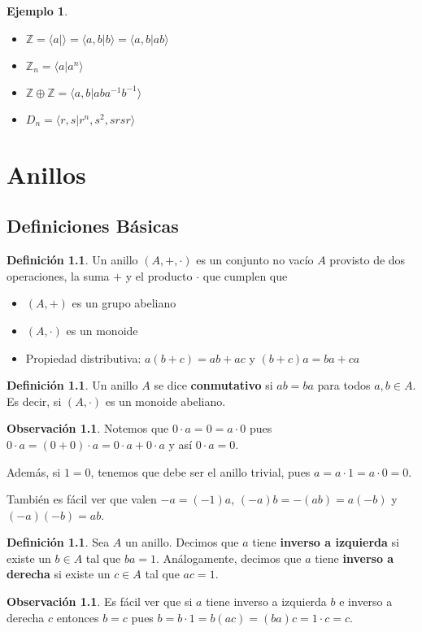 \documentclass[12pt]{book}
\theoremstyle{definition}
\newtheorem{obs}[teo]{Observación}
\newtheorem{defn}[teo]{Definición}
\newtheorem{ex}[teo]{Ejemplo}
\newcommand{\ZZ}{\mathbb{Z}}      %
\begin{document}
\begin{ex}
\begin{itemize}
\item $\ZZ=\langle a| \rangle  = \langle a,b | b\rangle = \langle a,b | ab\rangle$
\item $\ZZ_n = \langle a | a^n \rangle$
\item $\ZZ\oplus\ZZ = \langle a,b | aba^{-1}b^{-1}\rangle$
\item $D_n = \langle r,s|r^n ,s^2 , srsr\rangle$
\end{itemize}
\end{ex}

\chapter{Anillos}

\section{Definiciones Básicas}

\begin{defn}
Un anillo $(A,+,\cdot)$ es un conjunto no vacío $A$ provisto de dos operaciones, la suma $+$ y el producto $\cdot$ que cumplen que \begin{itemize}\item $(A,+)$ es un grupo abeliano \item $(A,\cdot)$ es un monoide \item Propiedad distributiva: $a(b+c)=ab+ac$ y $(b+c)a=ba+ca$\end{itemize}
\end{defn}

\begin{defn}
Un anillo $A$ se dice \textbf{conmutativo} si $ab=ba$ para todos $a,b\in A$. Es decir, si $(A,\cdot)$ es un monoide abeliano.
\end{defn}

\begin{obs}
Notemos que $0\cdot a = 0 = a\cdot 0$ pues $0\cdot a = (0+0)\cdot a = 0\cdot a + 0\cdot a$ y así $0\cdot a = 0$.

Además, si $1=0$, tenemos que debe ser el anillo trivial, pues $a=a\cdot 1 = a\cdot 0 = 0$.

También es fácil ver que valen $-a = (-1)a$, $(-a)b=-(ab) = a(-b)$ y $(-a)(-b)=ab$.
\end{obs}

\begin{defn}
Sea $A$ un anillo. Decimos que $a$ tiene \textbf{inverso a izquierda} si existe un $b\in A$ tal que $ba=1$. Análogamente, decimos que $a$ tiene \textbf{inverso a derecha} si existe un $c\in A$ tal que $ac=1$.
\end{defn}
\begin{obs}
Es fácil ver que si $a$ tiene inverso a izquierda $b$ e inverso a derecha $c$ entonces $b=c$ pues $b = b\cdot 1 = b(ac) = (ba)c = 1\cdot c = c $.
\end{obs}
\end{document}
